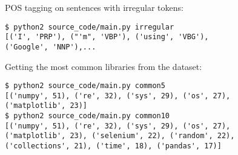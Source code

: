 POS tagging on sentences with irregular tokens:

\begin{lstlisting}
$ python2 source_code/main.py irregular
[('I', 'PRP'), ("'m", 'VBP'), ('using', 'VBG'),
('Google', 'NNP'),...
\end{lstlisting}

Getting the most common libraries from the dataset:

\begin{lstlisting}
$ python2 source_code/main.py common5
[('numpy', 51), ('re', 32), ('sys', 29), ('os', 27),
('matplotlib', 23)]
$ python2 source_code/main.py common10
[('numpy', 51), ('re', 32), ('sys', 29), ('os', 27),
('matplotlib', 23), ('selenium', 22), ('random', 22),
('collections', 21), ('time', 18), ('pandas', 17)]
\end{lstlisting}